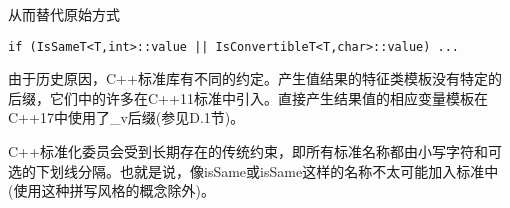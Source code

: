 从而替代原始方式

\begin{lstlisting}[style=styleCXX]
if (IsSameT<T,int>::value || IsConvertibleT<T,char>::value) ...
\end{lstlisting}

由于历史原因，C++标准库有不同的约定。产生值结果的特征类模板没有特定的后缀，它们中的许多在C++11标准中引入。直接产生结果值的相应变量模板在C++17中使用了\_v后缀(参见D.1节)。

\begin{tcolorbox}[colback=webgreen!5!white,colframe=webgreen!75!black]
\hspace*{0.75cm}C++标准化委员会受到长期存在的传统约束，即所有标准名称都由小写字符和可选的下划线分隔。也就是说，像isSame或isSame这样的名称不太可能加入标准中(使用这种拼写风格的概念除外)。
\end{tcolorbox}




